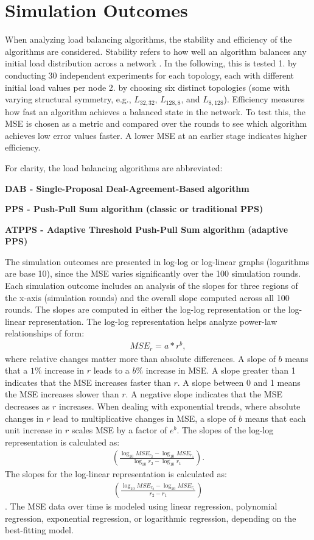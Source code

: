 \chapter{Simulation Outcomes}\label{chap:simulationoutcomes}
When analyzing load balancing algorithms, the stability and efficiency of the algorithms are considered. Stability refers to how well an algorithm balances any initial load distribution across a network \cite{ChengzhongFrancis}. In the following, this is tested 1. by conducting 30 independent experiments for each topology, each with different initial load values per node 2. by choosing six distinct topologies (some with varying structural symmetry, e.g., $L_{32,32}$, $L_{128,8}$, and $L_{8,128}$). Efficiency measures how fast an algorithm achieves a balanced state in the network. To test this, the MSE is chosen as a metric and compared over the rounds to see which algorithm achieves low error values faster. A lower MSE at an earlier stage indicates higher efficiency.

For clarity, the load balancing algorithms are abbreviated:

\textbf{DAB - Single-Proposal Deal-Agreement-Based algorithm}

\textbf{PPS - Push-Pull Sum algorithm (classic or traditional PPS)}

\textbf{ATPPS - Adaptive Threshold Push-Pull Sum algorithm (adaptive PPS)}

The simulation outcomes are presented in log-log or log-linear graphs (logarithms are base 10), since the MSE varies significantly over the 100 simulation rounds. Each simulation outcome includes an analysis of the slopes for three regions of the x-axis (simulation rounds) and the overall slope computed across all 100 rounds. The slopes are computed in either the log-log representation or the log-linear representation. The log-log representation helps analyze power-law relationships of form:
\begin{align}
    MSE_r=a*r^{b},
\end{align}
where relative changes matter more than absolute differences. A slope of $b$ means that a $1\%$ increase in $r$ leads to a $b\%$ increase in MSE. A slope greater than 1 indicates that the MSE increases faster than $r$. A slope between 0 and 1 means the MSE increases slower than $r$. A negative slope indicates that the MSE decreases as $r$ increases. When dealing with exponential trends, where absolute changes in $r$ lead to multiplicative changes in MSE, a slope of $b$ means that each unit increase in $r$ scales MSE by a factor of $e^{b}$. The slopes of the log-log representation is calculated as:
\begin{align}
    (\frac{\log_{10}{{MSE_{r_2}}-\log_{10}{MSE_{r_1}}}}{\log_{10}{r_2} - \log_{10}{r_1}}).
\end{align} 
The slopes for the log-linear representation is calculated as:
\begin{align}
    (\frac{\log_{10}{{MSE_{r_2}}-\log_{10}{MSE_{r_1}}}}{r_2 - r_1})
\end{align}
\cite{lorenzo_graphing}.
The MSE data over time is modeled using linear regression, polynomial regression, exponential regression, or logarithmic regression, depending on the best-fitting model.

